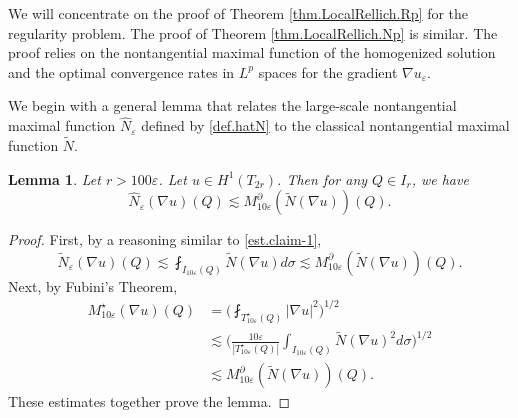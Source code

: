 \documentclass[reqno,12pt]{amsart} %
\newtheorem{lemma}[theorem]{Lemma}
\theoremstyle{definition}
\theoremstyle{remark}
\numberwithin{equation}{section}
\newcommand{\e}{\varepsilon}
\begin{document}



We will concentrate on the proof of Theorem \ref{thm.LocalRellich.Rp} for the regularity problem. The proof of Theorem \ref{thm.LocalRellich.Np} is similar.
The proof relies on the nontangential maximal function of the homogenized solution and the optimal convergence rates in $L^p$ spaces for the gradient $\nabla u_\e$.

We begin with a general lemma that relates the large-scale nontangential maximal function $\widehat{N}_\e$ defined by \eqref{def.hatN} to the classical nontangential maximal function $\widetilde{N}$.

\begin{lemma}\label{lem.hatN<M10eNDu}
    Let $ r > 100\e$. Let $u \in H^1(T_{2r})$. Then for any $Q \in I_r$, we have
    \begin{equation}
        \widehat{N}_\e(\nabla u)(Q) \lesssim M_{10\e}^\partial (\widetilde{N}(\nabla u))(Q).
    \end{equation}
\end{lemma}
\begin{proof}
    First, by a reasoning similar to \eqref{est.claim-1},
    \begin{equation}
        \widetilde{N}_\e(\nabla u)(Q) \lesssim \fint_{I_{10\e}(Q)} \widetilde{N}(\nabla u) d\sigma \lesssim M_{10\e}^\partial (\widetilde{N}(\nabla u))(Q).
    \end{equation}
    Next, by Fubini's Theorem,
    \begin{equation}
    \begin{aligned}
        M_{10\e}^\star(\nabla u)(Q) & = \bigg(\fint_{T_{10\e}^\star(Q)} |\nabla u|^2 \bigg)^{1/2} \\
        & \lesssim \bigg( \frac{10\e}{|T_{10\e}^\star(Q)|} \int_{I_{10\e}(Q)}  \widetilde{N}(\nabla u)^2 d\sigma  \bigg)^{1/2} \\
        & \lesssim M_{10\e}^\partial (\widetilde{N}(\nabla u))(Q).
    \end{aligned}
    \end{equation}
    These estimates together prove the lemma.
\end{proof}
\end{document}

